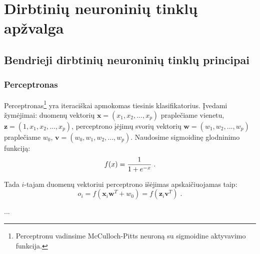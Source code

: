 \section{Dirbtinių neuroninių tinklų apžvalga}
\label{sec:Dirbtiniu neuroniniu tinklu apzvalga}

\subsection{Bendrieji dirbtinių neuroninių tinklų principai}
\subsubsection{Perceptronas}
\label{sec:Perceptronas}
Perceptronas\footnote{Perceptronu vadinsime McCulloch-Pitts neuroną su
sigmoidine aktyvavimo funkcija.} yra iteraciškai apmokomas tiesinis
klasifikatorius. %
Įvedami žymėjimai:
duomenų vektorių $\bm{x} = (x_1, x_2, ..., x_p)$ praplečiame vienetu, $\bm{z} =
(1, x_1, x_2, ..., x_p)$, perceptrono įėjimų svorių vektorių $\bm{w} = (w_1,
w_2, ..., w_p)$ praplečiame $w_0$, $\bm{v} = (w_0, w_1, w_2, ..., w_p)$.
Naudosime sigmoidinę glodninimo funkciją:
\begin{equation} \label{eq:sigmoid}
f(x) = {1 \over 1 + e^{-x}} \;.
\end{equation}

Tada $i$-tajam duomenų vektoriui perceptrono išėjimas apskaičiuojamas taip:
\begin{equation} \label{eq:perceptron output}
o_i = f(\bm{x}_i \bm{w}^T + w_0) = f(\bm{z}_i \bm{v}^T) \;.
\end{equation}

...
